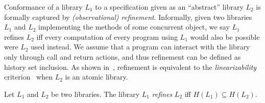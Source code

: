 Conformance of a library $L_1$ to a specification given as an ``abstract'' library $L_2$ 
is formally captured by \emph{(observational) refinement}. Informally, given two libraries
$L_1$ and $L_2$ implementing the methods of some concurrent object, we
say $L_1$ refines $L_2$ if{f} every computation of every program
using $L_1$ would also be possible were $L_2$ used instead. We assume that a program can 
interact with the library only through call and return actions, and thus refinement can be defined
as history set inclusion. As shown in~\citet{journals/tcs/FilipovicORY10,DBLP:conf/popl/BouajjaniEEH15},
refinement is equivalent to the \emph{linearizability} criterion~\cite{journals/toplas/HerlihyW90} when $L_2$ is an atomic library. 

\begin{dfn}
Let $L_1$ and $L_2$ be two libraries. 
The library $L_1$ \emph{refines} $L_2$ if{f} $H(L_1) \subseteq H(L_2)$.
\end{dfn}


